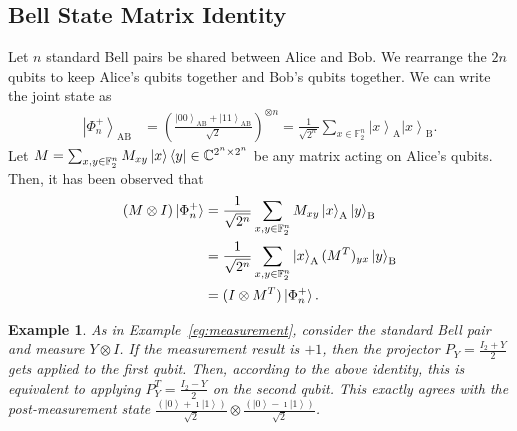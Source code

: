 \documentclass[journal,onecolumn]{IEEEtran}
\newtheorem{example}{Example}
\newcommand{\dket}[1]{\left\lvert #1 \right\rangle}
\begin{document}
\subsection{Bell State Matrix Identity}
\label{sec:bell_state_identity}


Let $n$ standard Bell pairs be shared between Alice and Bob. 
We rearrange the $2n$ qubits to keep Alice's qubits together and Bob's qubits together. 
We can write the joint state as 
\begin{align}    
\label{eq:bell_state_rearranged}
\dket{\Phi^{+}_n}_{\text{AB}} & = \left(\frac{\dket{00}_{\text{AB}} + \dket{11}_{\text{AB}}}{\sqrt{2}}\right)^{\otimes n} = \frac{1}{\sqrt{2^n}} \sum_{x \in \mathbb{F}_2^n} \dket{x}_{\text{A}} \dket{x}_{\text{B}}. 
\end{align}
Let $M = \sum_{x,y \in \mathbb{F}_2^n} M_{xy} \dketbra{x}{y} \in \mathbb{C}^{2^n \times 2^n}$ be any matrix acting on Alice's qubits.
Then, it has been observed that \cite{Bennett-pra96,Wilde-isit10}
\begin{align}
(M \otimes I)\ket{\Phi^{+}_n} & = \frac{1}{\sqrt{2^n}} \sum_{x,y \in \mathbb{F}_2^n} M_{xy} \dket{x}_{\text{A}} \dket{y}_{\text{B}} \\
%
  & = \frac{1}{\sqrt{2^n}} \sum_{x,y \in \mathbb{F}_2^n} \dket{x}_{\text{A}} (M^T)_{yx} \dket{y}_{\text{B}} \\
%
  & = (I \otimes M^T) \ket{\Phi^{+}_n}. 
\end{align}

\begin{example}
\label{eg:Y_measurement}
\normalfont
As in Example~\ref{eg:measurement}, consider the standard Bell pair and measure $Y \otimes I$. 
If the measurement result is $+1$, then the projector $P_Y = \frac{I_2 + Y}{2}$ gets applied to the first qubit.
Then, according to the above identity, this is equivalent to applying $P_Y^T = \frac{I_2 - Y}{2}$ on the second qubit.
This exactly agrees with the post-measurement state $\frac{(\dket{0} + \imath \dket{1})}{\sqrt{2}} \otimes \frac{(\dket{0} - \imath \dket{1})}{\sqrt{2}}$. \hfill \IEEEQEDhere
\end{example}
\end{document}
